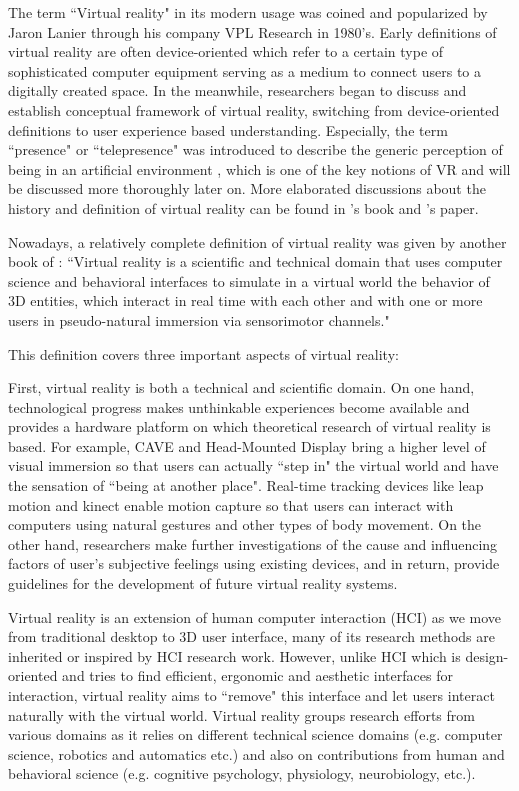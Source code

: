 The term ``Virtual reality" in its modern usage was coined and popularized by Jaron Lanier \citep{Lanier1992VR} through his company VPL Research in 1980's. Early definitions of virtual reality are often device-oriented which refer to a certain type of sophisticated computer equipment serving as a medium to connect users to a digitally created space. In the meanwhile, researchers began to discuss and establish conceptual framework of virtual reality, switching from device-oriented definitions to user experience based understanding. Especially, the term ``presence" or ``telepresence" was introduced to describe the generic perception of being in an artificial environment \citep{Sheridan1992MTV}, which is one of the key notions of VR and will be discussed more thoroughly later on. More elaborated discussions about the history and definition of virtual reality can be found in \citet{Rheingold1991VR}'s book and \citet{Steuer1995Defining}'s paper.

Nowadays, a relatively complete definition of virtual reality was given by another book of \citet{Fuchs2011Book}: ``Virtual reality is a scientific and technical domain that uses computer science and behavioral interfaces to simulate in a virtual world the behavior of 3D entities, which interact in real time with each other and with one or more users in pseudo-natural immersion via sensorimotor channels."

This definition covers three important aspects of virtual reality:

First, virtual reality is both a technical and scientific domain. On one hand, technological progress makes unthinkable experiences become available and provides a hardware platform on which theoretical research of virtual reality is based. For example, CAVE and Head-Mounted Display bring a higher level of visual immersion so that users can actually ``step in" the virtual world and have the sensation of ``being at another place". Real-time tracking devices like leap motion and kinect enable motion capture so that users can interact with computers using natural gestures and other types of body movement. On the other hand, researchers make further investigations of the cause and influencing factors of user's subjective feelings using existing devices, and in return, provide guidelines for the development of future virtual reality systems.

Virtual reality is an extension of human computer interaction (HCI) as we move from traditional desktop to 3D user interface, many of its research methods are inherited or inspired by HCI research work. However, unlike HCI which is design-oriented and tries to find efficient, ergonomic and aesthetic interfaces for interaction, virtual reality aims to ``remove" this interface and let users interact naturally with the virtual world. Virtual reality groups research efforts from various domains as it relies on different technical science domains (e.g. computer science, robotics and automatics etc.) and also on contributions from human and behavioral science (e.g. cognitive psychology, physiology, neurobiology, etc.).

